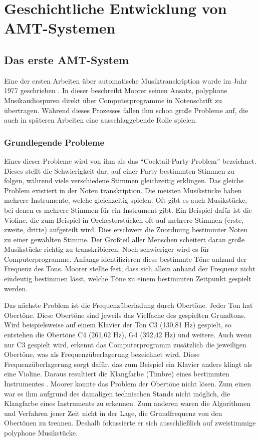 \section{Geschichtliche Entwicklung von AMT-Systemen}

\subsection{Das erste AMT-System}
Eine der ersten Arbeiten über automatische Musiktranskription wurde im Jahr 1977 geschrieben \cite{Moorer1977}.
In dieser beschreibt Moorer seinen Ansatz, polyphone Musikaudiospuren
direkt über Computerprogramme in Notenschrift zu übertragen.
Während dieses Prozesses fallen ihm schon große Probleme auf, die auch in späteren Arbeiten
eine ausschlaggebende Rolle spielen.

\subsubsection{Grundlegende Probleme}
Eines dieser Probleme wird von ihm als das \enquote{Cocktail-Party-Problem} bezeichnet.
Dieses stellt die Schwierigkeit dar, auf einer Party bestimmten Stimmen zu folgen, während viele verschiedene Stimmen
gleichzeitig erklingen.
Das gleiche Problem existiert in der Noten transkription.
Die meisten Musikstücke haben mehrere Instrumente, welche gleichzeitig spielen.
Oft gibt es auch Musikstücke, bei denen es mehrere Stimmen für ein Instrument gibt.
Ein Beispiel dafür ist die Violine, die zum Beispiel in Orchesterstücken oft auf mehrere Stimmen (erste, zweite, dritte) aufgeteilt wird.
Dies erschwert die Zuordnung bestimmter Noten zu einer gewählten Stimme.
Der Großteil aller Menschen scheitert daran große Musikstücke richtig zu transkribieren.
Noch schwieriger wird es für Computerprogramme.
Anfangs identifizieren diese bestimmte Töne anhand der Frequenz des Tons.
Moorer stellte fest, dass sich allein anhand der Frequenz nicht eindeutig bestimmen lässt,
welche Töne zu einem bestimmten Zeitpunkt gespielt werden.

Das nächste Problem ist die Frequenzüberladung durch Obertöne.
Jeder Ton hat Obertöne.
Diese Obertöne sind jeweils das Vielfache des gespielten Grundtons.
Wird beispielsweise auf einem Klavier der Ton C3 (130,81 Hz) gespielt,
so entstehen die Obertöne C4 (261,62 Hz), G4 (392,42 Hz) und weitere.
Auch wenn nur C3 gespielt wird, erkennt das Computerprogramm zusätzlich die jeweiligen Obertöne,
was als Frequenzüberlagerung bezeichnet wird.
Diese Frequenzüberlagerung sorgt dafür, das zum Beispiel ein Klavier anders klingt als eine Violine.
Daraus resultiert die Klangfarbe (Timbre) eines bestimmten Instrumentes \cite{goswami2013timbre}.
Moorer konnte das Problem der Obertöne nicht lösen.
Zum einen war es ihm aufgrund des damaligen technischen Stands nicht möglich, die Klangfarbe eines Instruments zu erkennen.
Zum anderen waren die Algorithmen und Verfahren jener Zeit nicht in der Lage, die Grundfrequenz von den Obertönen zu trennen.
Deshalb fokussierte er sich ausschließlich auf zweistimmige polyphone Musikstücke.

